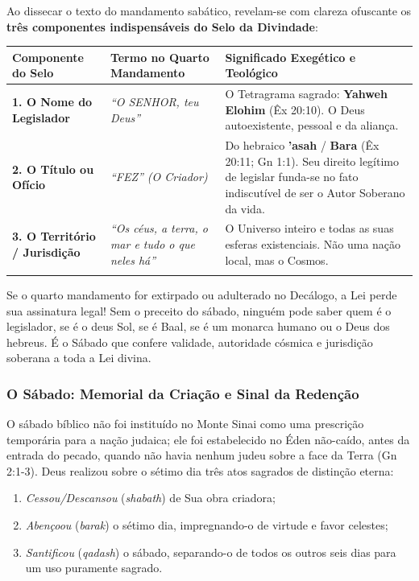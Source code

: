 \documentclass[11pt,a4paper,openany]{book}
\begin{document}
Ao dissecar o texto do mandamento sabático, revelam-se com clareza ofuscante os \textbf{três componentes indispensáveis do Selo da Divindade}:


\begin{table}[htbp]
\centering
\footnotesize
\setlength{\tabcolsep}{5pt}
\renewcommand{\arraystretch}{1.25}
\begin{tabularx}{\textwidth}{>{\raggedright\arraybackslash}p{} >{\raggedright\arraybackslash}X >{\raggedright\arraybackslash}X}
\toprule
\textbf{Componente do Selo} & \textbf{Termo no Quarto Mandamento} & \textbf{Significado Exegético e Teológico} \\
\midrule
\textbf{1. O Nome do Legislador} & \textit{``O SENHOR, teu Deus''} & O Tetragrama sagrado: \textbf{Yahweh Elohim} (Êx 20:10). O Deus autoexistente, pessoal e da aliança. \\
\addlinespace[3pt]
\textbf{2. O Título ou Ofício} & \textit{``FEZ'' (O Criador)} & Do hebraico \textbf{'asah} / \textbf{Bara} (Êx 20:11; Gn 1:1). Seu direito legítimo de legislar funda-se no fato indiscutível de ser o Autor Soberano da vida. \\
\addlinespace[3pt]
\textbf{3. O Território / Jurisdição} & \textit{``Os céus, a terra, o mar e tudo o que neles há''} & O Universo inteiro e todas as suas esferas existenciais. Não uma nação local, mas o Cosmos. \\
\addlinespace[3pt]
\bottomrule
\end{tabularx}
\end{table}


Se o quarto mandamento for extirpado ou adulterado no Decálogo, a Lei perde sua assinatura legal! Sem o preceito do sábado, ninguém pode saber quem é o legislador, se é o deus Sol, se é Baal, se é um monarca humano ou o Deus dos hebreus. É o Sábado que confere validade, autoridade cósmica e jurisdição soberana a toda a Lei divina.


\subsubsection*{O Sábado: Memorial da Criação e Sinal da Redenção}


O sábado bíblico não foi instituído no Monte Sinai como uma prescrição temporária para a nação judaica; ele foi estabelecido no Éden não-caído, antes da entrada do pecado, quando não havia nenhum judeu sobre a face da Terra (Gn 2:1-3). Deus realizou sobre o sétimo dia três atos sagrados de distinção eterna:
\begin{enumerate}
  \item \textit{Cessou/Descansou} (\textit{shabath}) de Sua obra criadora;
  \item \textit{Abençoou} (\textit{barak}) o sétimo dia, impregnando-o de virtude e favor celestes;
  \item \textit{Santificou} (\textit{qadash}) o sábado, separando-o de todos os outros seis dias para um uso puramente sagrado.
\end{enumerate}
\end{document}
